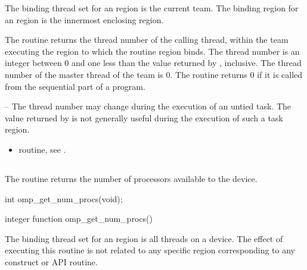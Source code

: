 \binding
The binding thread set for an  region is the current team. The 
binding region for an  region is the innermost enclosing 
 region. 

\effect
The  routine returns the thread number of the calling thread, 
within the team executing the  region to which the routine region binds. The 
thread number is an integer between 0 and one less than the value returned by 
, inclusive. The thread number of the master thread of the 
team is 0. The routine returns 0 if it is called from the sequential part of a program.

\notestart
\noteheader -- The thread number may change during the execution of an untied task. The 
value returned by  is not generally useful during the execution 
of such a task region.
\noteend

\crossreferences
\begin{itemize}
\item {} routine, see 
.
\end{itemize}








\subsection{}
\label{subsec:omp_get_num_procs}
\summary
The  routine returns the number of processors available to the 
device.

\format
\ccppspecificstart
\begin{boxedcode}
int omp\_get\_num\_procs(void);
\end{boxedcode}
\ccppspecificend

\fortranspecificstart
\begin{boxedcode}
integer function omp\_get\_num\_procs()
\end{boxedcode}
\fortranspecificend

\binding
The binding thread set for an  region is all threads on a device. 
The effect of executing this routine is not related to any specific region corresponding to 
any construct or API routine.

